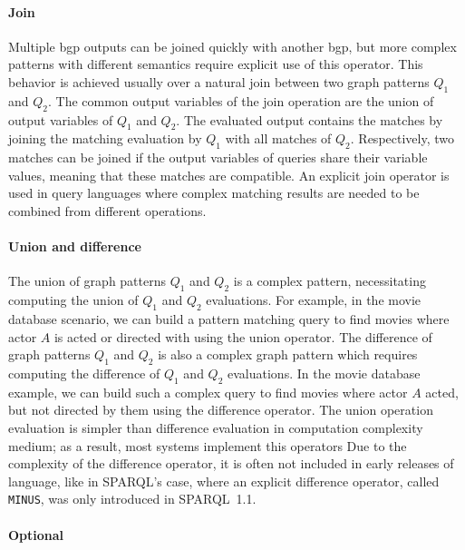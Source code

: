 \paragraph{Join}

Multiple bgp outputs can be joined quickly with another bgp, but more complex patterns with different semantics require explicit use of this operator.
This behavior is achieved usually over a natural join between two graph patterns $Q_1$ and $Q_2$. 
The common output variables of the join operation are the union of output variables of $Q_1$ and $Q_2$.
The evaluated output contains the matches by joining the matching evaluation by $Q_1$ with all matches of $Q_2$.
Respectively, two matches can be joined if the output variables of queries share their variable values, meaning that these matches are compatible.
An explicit join operator is used in query languages where complex matching results are needed to be combined from different operations.

\paragraph{Union and difference}

The union of graph patterns $Q_1$ and $Q_2$ is a complex pattern, necessitating computing the union of $Q_1$ and $Q_2$ evaluations.
For example, in the movie database scenario, we can build a pattern matching query to find movies where actor $A$ is acted or directed with using the union operator.
The difference of graph patterns $Q_1$ and $Q_2$ is also a complex graph pattern which requires computing the difference of $Q_1$ and $Q_2$ evaluations.
In the movie database example, we can build such a complex query to find movies where actor $A$ acted, but not directed by them using the difference operator.
The union operation evaluation is simpler than difference evaluation in computation complexity medium; as a result, most systems implement this operators
Due to the complexity of the difference operator, it is often not included in early releases of language, like in SPARQL's case, where an explicit difference operator, called \texttt{MINUS}, was only introduced in SPARQL~1.1.

\paragraph{Optional}

